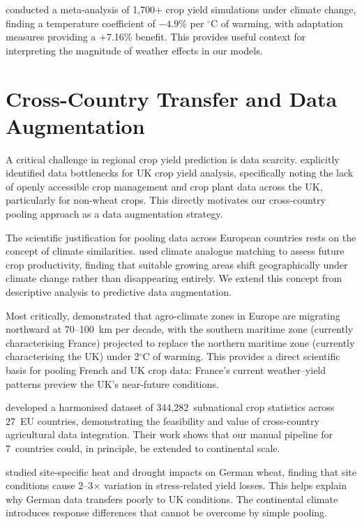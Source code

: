 \documentclass[12pt,a4paper]{report}
\newcommand{\degrees}{$^{\circ}$C}
\begin{document}
\citet{challinor2014} conducted a meta-analysis of 1,700+ crop yield simulations under climate change, finding a temperature coefficient of $-4.9$\% per \degrees{} of warming, with adaptation measures providing a +7.16\% benefit. This provides useful context for interpreting the magnitude of weather effects in our models.

\section{Cross-Country Transfer and Data Augmentation}

A critical challenge in regional crop yield prediction is data scarcity. \citet{corcoran2023} explicitly identified data bottlenecks for UK crop yield analysis, specifically noting the lack of openly accessible crop management and crop plant data across the UK, particularly for non-wheat crops. This directly motivates our cross-country pooling approach as a data augmentation strategy.

The scientific justification for pooling data across European countries rests on the concept of climate similarities. \citet{pugh2016} used climate analogue matching to assess future crop productivity, finding that suitable growing areas shift geographically under climate change rather than disappearing entirely. We extend this concept from descriptive analysis to predictive data augmentation.

Most critically, \citet{ceglar2019} demonstrated that agro-climate zones in Europe are migrating northward at 70--100~km per decade, with the southern maritime zone (currently characterising France) projected to replace the northern maritime zone (currently characterising the UK) under 2\degrees{} of warming. This provides a direct scientific basis for pooling French and UK crop data: France's current weather--yield patterns preview the UK's near-future conditions.

\citet{ronchetti2024} developed a harmonised dataset of 344,282~subnational crop statistics across 27~EU countries, demonstrating the feasibility and value of cross-country agricultural data integration. Their work shows that our manual pipeline for 7~countries could, in principle, be extended to continental scale.

\citet{riedesel2024} studied site-specific heat and drought impacts on German wheat, finding that site conditions cause 2--3$\times$ variation in stress-related yield losses. This helps explain why German data transfers poorly to UK conditions. The continental climate introduces response differences that cannot be overcome by simple pooling.
\end{document}
